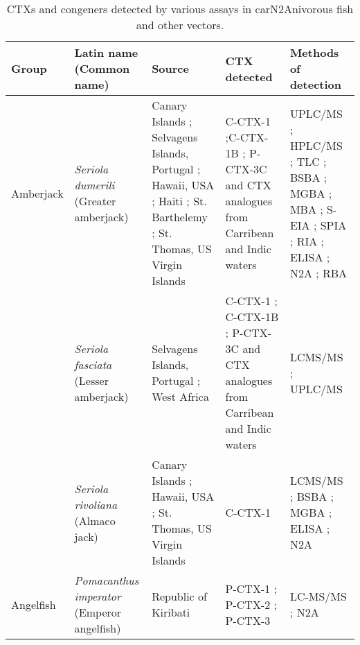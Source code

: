\documentclass[12pt]{article}
\begin{document}
		\FloatBarrier
	\begin{longtable}[l]{ | p{2cm} | p{3cm} | p{4.5cm} | p{2cm} | p{3cm} | }
	\caption{CTXs and congeners detected by various assays in carN2Anivorous fish and other vectors.}\\
	\hline
	\label{tbl:CarnTable}
	\textbf{Group} & \textbf{Latin name} (Common name) & \textbf{Source} & \textbf{CTX detected} & \textbf{Methods of detection} \\
	\hline
	Amberjack & \emph{Seriola dumerili} (Greater amberjack) & Canary Islands \cite{caillaud2012towards}; Selvagens Islands, Portugal \cite{otero2010first}; Hawaii, USA \cite{campora2008detection,hokama1977radioimmunoassay,hokama1983rapid,hokama1993evaluation}; Haiti \cite{poli1997identification}; St. Barthelemy \cite{vernoux1986heterogeneity}; St. Thomas, US Virgin Islands \cite{granade1976ciguatera} & C-CTX-1 \cite{poli1997identification};C-CTX-1B \cite{otero2010first}; P-CTX-3C and CTX analogues from Carribean and Indic waters \cite{otero2010first} & UPLC/MS \cite{otero2010first}; HPLC/MS \cite{poli1997identification}; TLC \cite{vernoux1986heterogeneity}; BSBA \cite{granade1976ciguatera}; MGBA \cite{campora2008detection,granade1976ciguatera}; MBA \cite{hokama1983rapid,hokama1993evaluation,vernoux1986heterogeneity}; S-EIA \cite{hokama1993evaluation}; SPIA \cite{otero2010first}; RIA \cite{campora2008detection,hokama1983rapid}; ELISA \cite{campora2008detection}; N2A \cite{caillaud2012towards,campora2008detection}; RBA \cite{poli1997identification} \\
	& \emph{Seriola fasciata} (Lesser amberjack) & Selvagens Islands, Portugal \cite{otero2010first}; West Africa \cite{boada2010ciguatera} & C-CTX-1 \cite{boada2010ciguatera}; C-CTX-1B \cite{otero2010first}; P-CTX-3C and CTX analogues from Carribean and Indic waters \cite{otero2010first} & LCMS/MS \cite{boada2010ciguatera}; UPLC/MS \cite{otero2010first}\\
	& \emph{Seriola rivoliana} (Almaco jack) & Canary Islands \cite{campora2010evaluating}; Hawaii, USA \cite{campora2008detection}; St. Thomas, US Virgin Islands \cite{granade1976ciguatera} & C-CTX-1 \cite{rivoliana1999ciguatera} & LCMS/MS \cite{rivoliana1999ciguatera}; BSBA \cite{granade1976ciguatera}; MGBA \cite{granade1976ciguatera}; ELISA \cite{campora2008detection,campora2010evaluating}; N2A \cite{campora2008detection,campora2010evaluating} \\ 
	\hline
	Angelfish  & \emph{Pomacanthus imperator} (Emperor angelfish) & Republic of Kiribati \cite{mak2013pacific} & P-CTX-1 \cite{mak2013pacific}; P-CTX-2 \cite{mak2013pacific}; P-CTX-3 \cite{mak2013pacific} & LC-MS/MS \cite{mak2013pacific}; N2A \cite{mak2013pacific} \\

\end{longtable}
\end{document}
